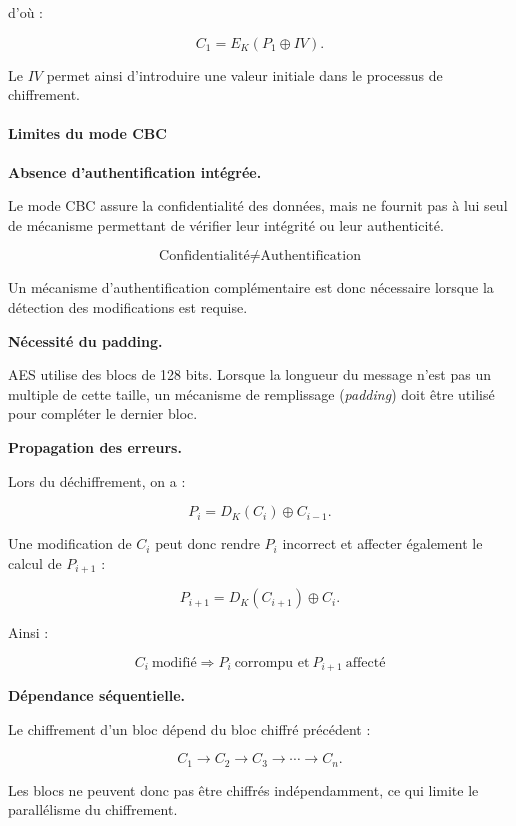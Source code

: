 \documentclass[12pt,a4paper]{article}
\begin{document}
d'où :

\[
C_1 = E_K(P_1 \oplus IV).
\]

Le $IV$ permet ainsi d'introduire une valeur initiale dans le
processus de chiffrement.


\paragraph{Limites du mode CBC}

\textbf{Absence d'authentification intégrée.}

Le mode CBC assure la confidentialité des données, mais ne fournit pas
à lui seul de mécanisme permettant de vérifier leur intégrité ou leur
authenticité.

\[
\boxed{
\text{Confidentialité} \neq \text{Authentification}
}
\]

Un mécanisme d'authentification complémentaire est donc nécessaire
lorsque la détection des modifications est requise.

\textbf{Nécessité du padding.}

AES utilise des blocs de 128 bits. Lorsque la longueur du message
n'est pas un multiple de cette taille, un mécanisme de remplissage
(\textit{padding}) doit être utilisé pour compléter le dernier bloc.

\textbf{Propagation des erreurs.}

Lors du déchiffrement, on a :

\[
P_i = D_K(C_i) \oplus C_{i-1}.
\]

Une modification de $C_i$ peut donc rendre $P_i$ incorrect et affecter
également le calcul de $P_{i+1}$ :

\[
P_{i+1} = D_K(C_{i+1}) \oplus C_i.
\]

Ainsi :

\[
\boxed{
C_i\ \text{modifié}
\Rightarrow
P_i\ \text{corrompu et}\ P_{i+1}\ \text{affecté}
}
\]

\textbf{Dépendance séquentielle.}

Le chiffrement d'un bloc dépend du bloc chiffré précédent :

\[
C_1 \rightarrow C_2 \rightarrow C_3
\rightarrow \cdots \rightarrow C_n.
\]

Les blocs ne peuvent donc pas être chiffrés indépendamment, ce qui
limite le parallélisme du chiffrement.
\end{document}
